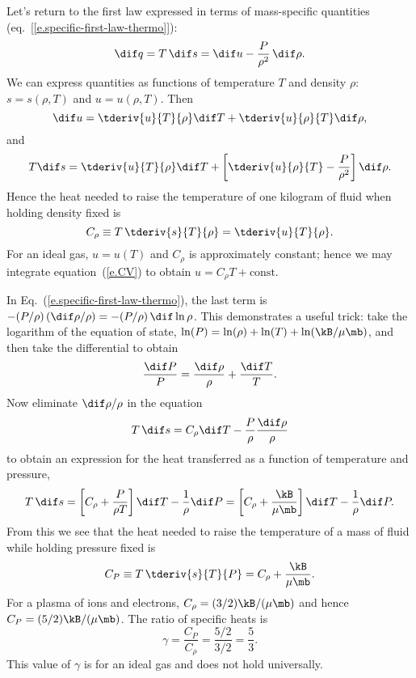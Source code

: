 Let's return to the first law expressed in terms of mass-specific quantities (eq.~[\ref{e.specific-first-law-thermo}]):
\[
	\dif q = T\,\dif s = \dif u -\frac{P}{\rho^{2}}\,\dif \rho.
\]
We can express quantities as functions of temperature $T$ and density $\rho$: $s = s(\rho,T)$ and $u = u(\rho,T)$. Then
\[ \dif u = \tderiv{u}{T}{\rho}\dif T + \tderiv{u}{\rho}{T}\dif \rho, \]
and
\[ T\dif s = \tderiv{u}{T}{\rho}\dif T + \left[\tderiv{u}{\rho}{T} - \frac{P}{\rho^{2}}\right]\dif \rho. \]
Hence the heat needed to raise the temperature of one kilogram of fluid when holding density fixed is
\begin{equation}\label{e.CV}
C_{\rho} \equiv T\,\tderiv{s}{T}{\rho} = \tderiv{u}{T}{\rho}.
\end{equation}
For an ideal gas, $u = u(T)$ and $C_{\rho}$ is approximately constant; hence we may integrate equation~(\ref{e.CV}) to obtain $u = C_{\rho}T + \textrm{const}$.

In Eq.~(\ref{e.specific-first-law-thermo}), the last term is $-(P/\rho)\, (\dif\rho/\rho) = -(P/\rho)\,\dif\ln\rho$. This demonstrates a useful trick: take the logarithm of the equation of state, $\ln (P) = \ln(\rho) + \ln (T) + \ln (\kB/\mu\mb)$, and then take the differential to obtain
\[ \frac{\dif P}{P} = \frac{\dif\rho}{\rho} + \frac{\dif T}{T}. \]
Now eliminate $\dif\rho/\rho$ in the equation
\[ T\,\dif s = C_{\rho}\dif T - \frac{P}{\rho}\frac{\dif\rho}{\rho} \]
to obtain an expression for the heat transferred as a function of temperature and pressure,
\begin{equation}\label{e.first-law-pressure-temperature}
T\,\dif s = \left[C_{\rho} + \frac{P}{\rho T}\right]\dif T - \frac{1}{\rho}\dif P
	 = \left[C_{\rho} + \frac{\kB}{\mu\mb}\right]\dif T - \frac{1}{\rho}\dif P.
\end{equation}
From this we see that the heat needed to raise the temperature of a mass of fluid while holding pressure fixed is
\begin{equation}\label{e.CP}
C_{P}\equiv T\,\tderiv{s}{T}{P} = C_{\rho} + \frac{\kB}{\mu\mb}.
\end{equation}
For a plasma of ions and electrons, $C_\rho = (3/2)\kB/(\mu\mb)$ and hence $C_P = (5/2)\kB/(\mu\mb)$.  The ratio of specific heats is
\begin{equation}\label{e.gamma}
    \gamma = \frac{C_P}{C_\rho} = \frac{5/2}{3/2} = \frac{5}{3}.
\end{equation}
This value of $\gamma$ is for an ideal gas and does not hold universally.

